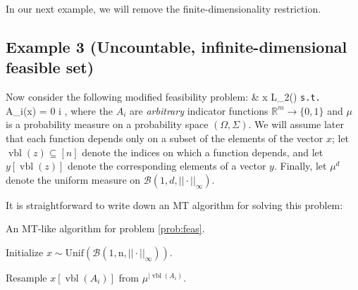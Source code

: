 \documentclass[twocolumn]{article}
\def\seqn#1\eeqn{\begin{align}#1\end{align}}
\newcommand{\hasDist}%
  {\sim}
\newcommand{\Reals}%
  {\mathbb{R}}
\begin{document}
In our next example, we will remove the finite-dimensionality restriction.

\subsection{Example 3 (Uncountable, infinite-dimensional feasible set)}

\label{subsec:uncountable}
Now consider the following modified feasibility problem:
\seqn
  \label{prob:feas}
   & x \in L_2(\mu) \texttt{s.t.} \\ %
  A_i(x) = 0 \forall i \in [m] ,
\eeqn
where the $A_i$ are \emph{arbitrary} indicator functions $\Reals^{m} \to \{0,1\}$ and $\mu$ is a probability measure on a probability space $(\Omega, \Sigma)$.  We will assume later that each function depends only on a subset of the elements of the vector $x$; let $\operatorname{vbl}(z) \subseteq [n]$ denote the indices on which a function depends, and let $y[\operatorname{vbl}(z)]$ denote the corresponding elements of a vector $y$.  Finally, let $\mu^d$ denote the uniform measure on $\mathcal{B}(1, d, ||\cdot||_\infty)$.

It is straightforward to write down an MT algorithm for solving this problem:

\begin{algorithm}[H]
\caption{An MT-like algorithm for problem \ref{prob:feas}.}
\label{alg:mt-feas}
\begin{algorithmic}[1]

\State Initialize $x \hasDist \operatorname{Unif(\mathcal{B}(1, n, ||\cdot||_\infty))}$.
\EndFor

    \Return
  \EndIf
  \State Resample $x[\operatorname{vbl}(A_i)]$ from $\mu^{|\operatorname{vbl}(A_i)}$.
  \EndFor
\EndFunction

\end{algorithmic}
\end{algorithm}
\end{document}
